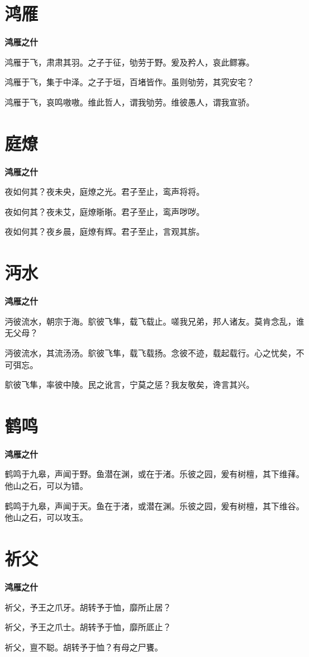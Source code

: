 \documentclass[12pt,a4paper]{ctexbook}
\begin{document}
\section{鸿雁}
\textbf{鸿雁之什}\par\vspace{0.5em}
鸿雁于飞，肃肃其羽。之子于征，劬劳于野。爰及矜人，哀此鳏寡。\par
鸿雁于飞，集于中泽。之子于垣，百堵皆作。虽则劬劳，其究安宅？\par
鸿雁于飞，哀鸣嗷嗷。维此哲人，谓我劬劳。维彼愚人，谓我宣骄。\par

\section{庭燎}
\textbf{鸿雁之什}\par\vspace{0.5em}
夜如何其？夜未央，庭燎之光。君子至止，鸾声将将。\par
夜如何其？夜未艾，庭燎晣晣。君子至止，鸾声哕哕。\par
夜如何其？夜乡晨，庭燎有辉。君子至止，言观其旂。\par

\section{沔水}
\textbf{鸿雁之什}\par\vspace{0.5em}
沔彼流水，朝宗于海。鴥彼飞隼，载飞载止。嗟我兄弟，邦人诸友。莫肯念乱，谁无父母？\par
沔彼流水，其流汤汤。鴥彼飞隼，载飞载扬。念彼不迹，载起载行。心之忧矣，不可弭忘。\par
鴥彼飞隼，率彼中陵。民之讹言，宁莫之惩？我友敬矣，谗言其兴。\par

\section{鹤鸣}
\textbf{鸿雁之什}\par\vspace{0.5em}
鹤鸣于九皋，声闻于野。鱼潜在渊，或在于渚。乐彼之园，爰有树檀，其下维萚。他山之石，可以为错。\par
鹤鸣于九皋，声闻于天。鱼在于渚，或潜在渊。乐彼之园，爰有树檀，其下维谷。他山之石，可以攻玉。\par

\section{祈父}
\textbf{鸿雁之什}\par\vspace{0.5em}
祈父，予王之爪牙。胡转予于恤，靡所止居？\par
祈父，予王之爪士。胡转予于恤，靡所厎止？\par
祈父，亶不聪。胡转予于恤？有母之尸饔。\par
\end{document}
